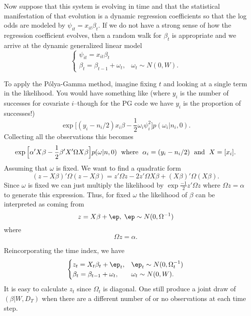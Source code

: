 \documentclass[11pt]{article}
\newcommand{\Polya}{P\'{o}lya}
\begin{document}
Now suppose that this system is evolving in time and that the statistical
manifestation of that evolution is a dynamic regression coefficients so that the
log odds are modeled by \( \psi_{it} = x_{it} \beta_t.  \) If we do not have a
strong sense of how the regression coefficient evolves, then a random walk for
$\beta_t$ is appropriate and we arrive at the dynamic generalized linear model
\[
\begin{cases}
\psi_{it} = x_{it} \beta_t \\
\beta_t = \beta_{t-1} + \omega_t, & \omega_t \sim N(0, W).
\end{cases}
\]

To apply the \Polya-Gamma method, imagine fixing $t$ and looking at a single
term in the likelihood.  You would have something like (where $y_i$ is the
number of successes for covariate $i$--though for the PG code we have $y_i$ is
the proportion of successes!)
\[
\exp \Big[ (y_{i} - n_{i}/2) x_{i} \beta - \frac{1}{2} \omega_{i} \psi_i^2
\Big] 
p(\omega_i | n_i, 0). 
\]
Collecting all the observations this becomes
\[
\exp \Big[ \alpha' X \beta - \frac{1}{2} \beta' X' \Omega X \beta \Big]
p(\omega | n, 0) \;
\textmd{ where } \;
\alpha_i = (y_i - n_i/2) \; \textmd{ and } \; X = [x_i].
\]
Assuming that $\omega$ is fixed.  We want to find a quadratic form
\[
(z - X \beta)' \Omega (z - X \beta) = z' \Omega z - 2 z' \Omega X \beta + (X
\beta)' \Omega (X \beta).
\]
Since $\omega$ is fixed we can just multiply the likelihood by $\exp
\frac{-1}{2} z' \Omega z$ where $\Omega z = \alpha$ to generate this expression.
Thus, for fixed $\omega$ the likelihood of $\beta$ can be interpreted as coming from
\[
z = X \beta + \ep, \; \ep \sim N(0, \Omega^{-1})
\]
where
\[
\Omega z = \alpha.
\]
\begin{comment}
(Waving my hands: We have $\Omega z = \alpha = y - n/2$.  Thus we should have $y
= \Omega z + n/2$.  Use for generating synthetic data?  No, its pseudo-data.)
\end{comment}
Reincorporating the time index, we have
\[
\begin{cases}
z_t = X_t \beta_t + \ep_t, & \ep_t \sim N(0, \Omega_t^{-1}) \\
\beta_t = \beta_{t-1} + \omega_t, & \omega_t \sim N(0, W).
\end{cases}
\]
It is easy to calculate $z_t$ since $\Omega_t$ is diagonal.  One still produce a
joint draw of $(\beta | W, D_T)$ when there are a different number of or no
observations at each time step.
\begin{comment}
  The one place that we need to be careful is that there may be a variable
  number of observations at each point in time.  Thus the number of rows in
  $z_t$ and $X_t$ is $m_t$, which may vary.  Also, it may be the case that there
  are no observations, in which case we have the equivalent of missing data.  I
  believe the dynamic linear model shouldn't have a problem with that.
\end{comment}
\end{document}
